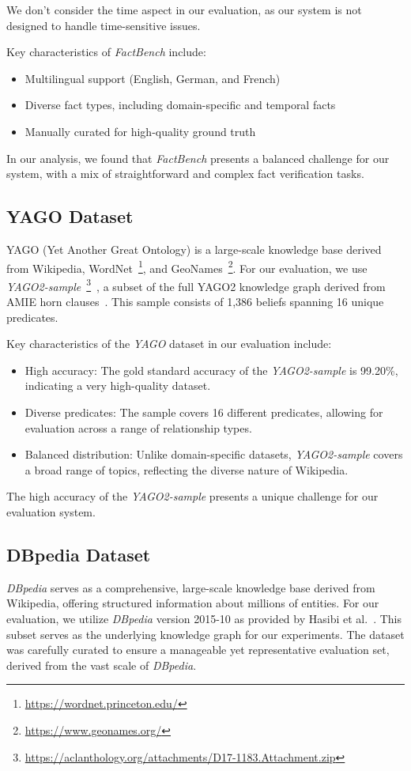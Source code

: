 We don't consider the time aspect in our evaluation, as our system is not designed to handle time-sensitive issues.

Key characteristics of \textit{FactBench} include:
\begin{itemize}
    \item Multilingual support (English, German, and French)
    \item Diverse fact types, including domain-specific and temporal facts
    \item Manually curated for high-quality ground truth
\end{itemize}

In our analysis, we found that \textit{FactBench} presents a balanced challenge for our system, with a mix of straightforward and complex fact verification tasks.
\subsection{YAGO Dataset}\label{subsec:empirical-evaluation:dataset-analysis:yago}
YAGO (Yet Another Great Ontology) is a large-scale knowledge base derived from Wikipedia, WordNet~\footnote{\url{https://wordnet.princeton.edu/}}, and GeoNames~\footnote{\url{https://www.geonames.org/}}.
For our evaluation, we use \textit{YAGO2-sample}~\footnote{\url{https://aclanthology.org/attachments/D17-1183.Attachment.zip}}~\cite{ojha-talukdar-2017-kgeval}, a subset of the full YAGO2 knowledge graph derived from AMIE horn clauses~\cite{Yago_AMIE}.
This sample consists of 1,386 beliefs spanning 16 unique predicates.

Key characteristics of the \textit{YAGO} dataset in our evaluation include:
\begin{itemize}
    \item High accuracy: The gold standard accuracy of the \textit{YAGO2-sample} is 99.20\%, indicating a very high-quality dataset.
    \item Diverse predicates: The sample covers 16 different predicates, allowing for evaluation across a range of relationship types.
    \item Balanced distribution: Unlike domain-specific datasets, \textit{YAGO2-sample} covers a broad range of topics, reflecting the diverse nature of Wikipedia.
\end{itemize}

The high accuracy of the \textit{YAGO2-sample} presents a unique challenge for our evaluation system.
\subsection{DBpedia Dataset}\label{subsec:empirical-evaluation:dataset-analysis:dbpedia}
\textit{DBpedia} serves as a comprehensive, large-scale knowledge base derived from Wikipedia, offering structured information about millions of entities.
For our evaluation, we utilize \textit{DBpedia} version 2015-10 as provided by Hasibi et al.~\cite{10.1145/3077136.3080810}.
This subset serves as the underlying knowledge graph for our experiments.
The dataset was carefully curated to ensure a manageable yet representative evaluation set, derived from the vast scale of \textit{DBpedia}.

